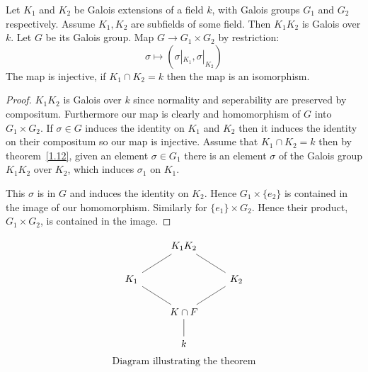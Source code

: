 \begin{theorem}\label{1.14}
    Let $K_1$ and $K_2$ be Galois extensions of a field $k$, with Galois groups $G_1$ and $G_2$ respectively. Assume $K_1,K_2$ are subfields of some field. Then $K_1K_2$ is Galois over $k$. Let $G$ be its Galois group. Map $G\rightarrow G_1\times G_2$ by restriction:\[
        \sigma \mapsto (\sigma|_{K_1}, \sigma|_{K_2})    
    \]
    The map is injective, if $K_1\cap K_2 = k$ then the map is an isomorphism.
    \begin{proof}
        $K_1K_2$ is Galois over $k$ since normality and seperability are preserved by compositum. Furthermore our map is clearly and homomorphism of $G$ into $G_1\times G_2$. If $\sigma\in G$ induces the identity on $K_1$ and $K_2$ then it induces the identity on their compositum so our map is injective. Assume that $K_1\cap K_2 = k$ then by theorem~\ref{1.12}, given an element $\sigma\in G_1$ there is an element $\sigma$ of the Galois group $K_1K_2$ over $K_2$, which induces $\sigma_1$ on $K_1$. 

        This $\sigma$ is in $G$ and induces the identity on $K_2$. Hence $G_1\times \{e_2\}$ is contained in the image of our homomorphism. Similarly for $\{e_1\}\times G_2$. Hence their product, $G_1\times G_2$, is contained in the image. 
    \end{proof}
    \[
\begin{tikzcd}
    &K_1K_2 \arrow[rd, dash] \arrow[ld,  dash]&\\
    K_1 \arrow[dr, dash]&& K_2 \arrow[dl, dash]\\
    &K\cap F \arrow[d,dash]&\\
    &k&
\end{tikzcd}
\]
\[
    \text{Diagram illustrating the theorem}
\]
 \end{theorem}

